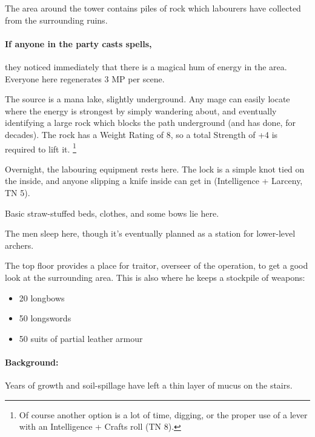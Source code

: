 \begin{multicols}{2}

The area around the tower contains piles of rock which labourers have collected from the surrounding ruins.

\paragraph{If anyone in the party casts spells,}
they noticed immediately that there is a magical hum of energy in the area.
Everyone here regenerates 3 MP per scene.

The source is a mana lake, slightly underground.
Any mage can easily locate where the energy is strongest by simply wandering about, and eventually identifying a large rock which blocks the path underground (and has done, for decades).
The rock has a Weight Rating of 8, so a total Strength of +4 is required to lift it.%
\footnote{Of course another option is a lot of time, digging, or the proper use of a lever with an Intelligence + Crafts roll (TN 8).}



Overnight, the labouring equipment rests here.
The lock is a simple knot tied on the inside, and anyone slipping a knife inside can get in (Intelligence + Larceny, TN 5).


Basic straw-stuffed beds, clothes, and some bows lie here.


The men sleep here, though it's eventually planned as a station for lower-level archers.


The top floor provides a place for \gls{traitor}, overseer of the operation, to get a good look at the surrounding area.
This is also where he keeps a stockpile of weapons:

\begin{itemize}

  \item{20 longbows}
  \item{50 longswords}
  \item{50 suits of partial leather armour}

\end{itemize}

\label{underGreenTower}

\paragraph{Background:}
Years of growth and soil-spillage have left a thin layer of mucus on the stairs.


\end{multicols}
